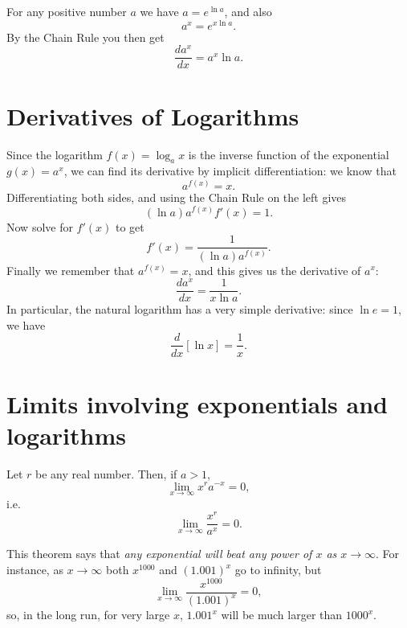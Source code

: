 For any positive number $a$ we have $a=e^{\ln a}$, and also
\[
a^x = e^{x\ln a}.
\]
By the Chain Rule you then get
\begin{equation}
  \label{eq:derivative-of-ax}
  \dfrac{da^x}{dx} = a^x\ln a.
\end{equation}




\section{Derivatives of Logarithms} %
Since the logarithm $f(x)=\log_a x$ is the inverse function of the exponential
$g(x) = a^x$, we can find its derivative by implicit differentiation: we know
that
\[
a^{f(x)} = x.
\]
Differentiating both sides, and using the Chain Rule on the left gives
\[
(\ln a)  a^{f(x)} f'(x) = 1.
\]
Now solve for $f'(x)$ to get
\[
f'(x) = \frac{1}{(\ln a) a^{f(x)}}.
\]
Finally we remember that $a^{f(x)} = x$, and this gives us the derivative of $a^x$:
\[
\frac{da^x}{dx} = \frac{1}{x\ln a}.
\]
In particular, the natural logarithm has a very simple derivative: since $\ln
e=1$, we have
\begin{equation}\label{eq:derivative-of-ln}
 \frac{d}{dx}\left[\ln x\right] = \frac{1}{x}.
\end{equation}


\section{Limits involving exponentials and logarithms} %
\begin{theorem}  Let $r$ be any real number.  Then, if $a>1$,
  \[
  \lim_{x\to\infty} x^r a^{-x} = 0,
  \]
  i.e.
  \[
  \lim_{x \to\infty}\frac{x^r}{a^x} = 0.
  \]
\end{theorem}
This theorem says that \textit{any exponential will beat any power of $x$ as
  $x\to\infty$}.  For instance, as $x \to\infty$ both $x^{1000}$ and $(1.001)^x$
go to infinity, but
\[
\lim_{x \to\infty} \frac{x^{1000}}{(1.001)^x} = 0,
\]
so, in the long run, for very large $x$, $1.001^x$ will be much larger than
$1000^x$.



%

